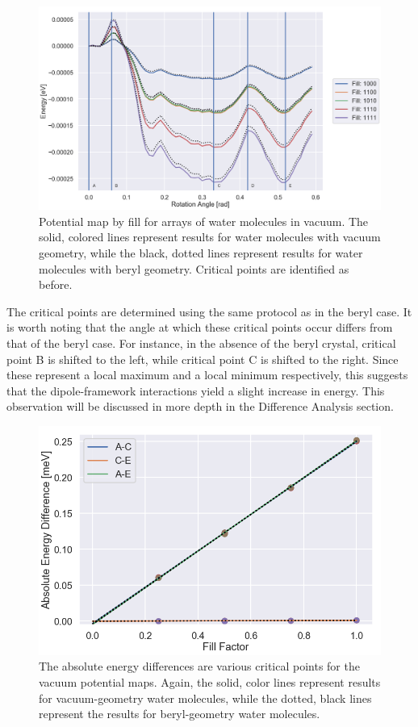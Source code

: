         \begin{figure}
            \centering
            \includegraphics[width=0.9\linewidth]{Figures/System/pmap_vacuum_comparison.png}
            \caption{Potential map by fill for arrays of water molecules in vacuum. The solid, colored lines represent results for water molecules with vacuum geometry, while the black, dotted lines represent results for water molecules with beryl geometry. Critical points are identified as before.}
            \label{fig:pmap_vacuum_comparison}
        \end{figure}
        
        The critical points are determined using the same protocol as in the beryl case. It is worth noting that the angle at which these critical points occur differs from that of the beryl case. For instance, in the absence of the beryl crystal, critical point B is shifted to the left, while critical point C is shifted to the right. Since these represent a local maximum and a local minimum respectively, this suggests that the dipole-framework interactions yield a slight increase in energy. This observation will be discussed in more depth in the Difference Analysis section.
        
        \begin{figure}
            \centering
            \includegraphics[width=0.9\linewidth]{Figures/System/pmap_vacuum_cps.png}
            \caption{The absolute energy differences are various critical points for the vacuum potential maps. Again, the solid, color lines represent results for vacuum-geometry water molecules, while the dotted, black lines represent the results for beryl-geometry water molecules.}
            \label{fig:pmap_vaccum_cps}
        \end{figure}
        
